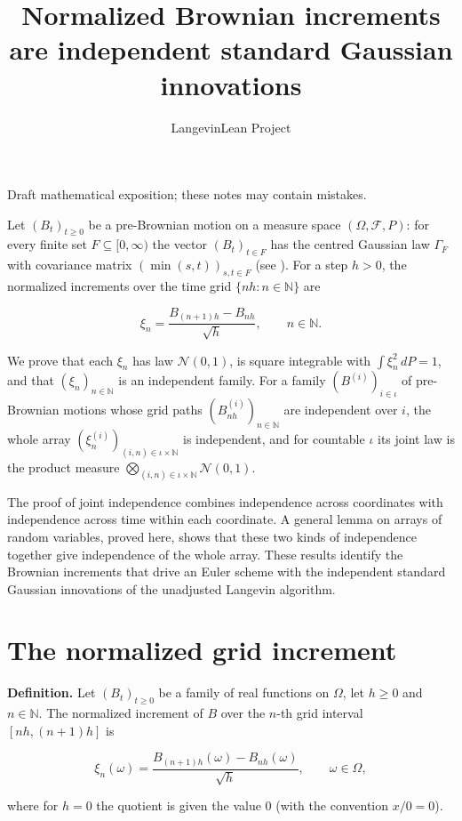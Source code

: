\documentclass[11pt,a4paper]{article}
\title{\texorpdfstring{Normalized Brownian increments are independent standard Gaussian innovations}{Normalized Brownian increments are independent standard Gaussian innovations}}
\author{LangevinLean Project}
\date{}
\begin{document}
\maketitle
Draft mathematical exposition; these notes may contain mistakes.


Let \((B_t)_{t\ge0}\) be a pre-Brownian motion on a measure space \((\Omega,\mathcal F,P)\): for every finite set \(F\subseteq[0,\infty)\) the vector \((B_t)_{t\in F}\) has the centred Gaussian law \(\Gamma_F\) with covariance matrix \((\min(s,t))_{s,t\in F}\) (see \cite[Section~3.8.15]{LangevinLean2026ULASC}). For a step \(h>0\), the normalized increments over the time grid \(\{nh:n\in\mathbb N\}\) are


\[\xi_n=\frac{B_{(n+1)h}-B_{nh}}{\sqrt h},\qquad n\in\mathbb N.\]


We prove that each \(\xi_n\) has law \(\mathcal N(0,1)\), is square integrable with \(\int\xi_n^2\,dP=1\), and that \((\xi_n)_{n\in\mathbb N}\) is an independent family. For a family \((B^{(i)})_{i\in\iota}\) of pre-Brownian motions whose grid paths \((B^{(i)}_{nh})_{n\in\mathbb N}\) are independent over \(i\), the whole array \((\xi^{(i)}_n)_{(i,n)\in\iota\times\mathbb N}\) is independent, and for countable \(\iota\) its joint law is the product measure \(\bigotimes_{(i,n)\in\iota\times\mathbb N}\mathcal N(0,1)\).




The proof of joint independence combines independence across coordinates with independence across time within each coordinate. A general lemma on arrays of random variables, proved here, shows that these two kinds of independence together give independence of the whole array. These results identify the Brownian increments that drive an Euler scheme with the independent standard Gaussian innovations of the unadjusted Langevin algorithm.


\section{\texorpdfstring{The normalized grid increment}{The normalized grid increment}}


\textbf{Definition.} Let \((B_t)_{t\ge0}\) be a family of real functions on \(\Omega\), let \(h\ge0\) and \(n\in\mathbb N\). The normalized increment of \(B\) over the \(n\)-th grid interval \([nh,(n+1)h]\) is


\[\xi_n(\omega)=\frac{B_{(n+1)h}(\omega)-B_{nh}(\omega)}{\sqrt h},\qquad\omega\in\Omega,\]


where for \(h=0\) the quotient is given the value \(0\) (with the convention \(x/0=0\)).
\end{document}
